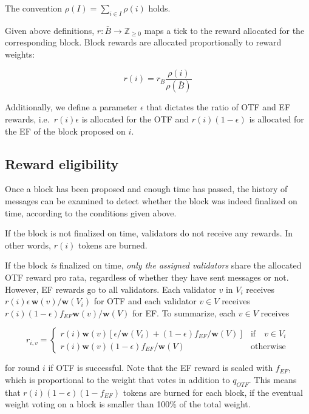 \documentclass[12pt]{article}
\begin{document}
The convention $\rho(I)=\sum_{i \in I} \rho(i)$ holds.

Given above definitions, $r:\bar{B}\to \mathbb{Z}_{\geq 0}$ maps a tick to the reward allocated for the corresponding block. Block rewards are allocated proportionally to reward weights:

\begin{equation}
  r(i) = r_B \frac{\rho(i)}{\rho(\bar{B})}
\end{equation}

Additionally, we define a parameter $\epsilon$ that dictates the ratio of OTF and EF rewards, i.e.~$r(i)\epsilon$ is allocated for the OTF and $r(i)(1-\epsilon)$ is allocated for the EF of the block proposed on $i$.

\subsection{Reward eligibility}
\label{reward-eligibility}

Once a block has been proposed and enough time has passed, the history of messages can be examined to detect whether the block was indeed finalized on time, according to the conditions given above.

If the block is not finalized on time, validators do not receive any rewards. In other words, $r(i)$ tokens are burned.

If the block \emph{is} finalized on time, \emph{only the assigned validators} share the allocated OTF reward pro rata, regardless of whether they have sent messages or not. However, EF rewards go to all validators. Each validator $v$ in $V_i$ receives $r(i)\epsilon \,\boldsymbol{w}(v)/\boldsymbol{w}(V_i)$ for OTF and each validator $v\in V$ receives $r(i)(1-\epsilon)f_{EF}\boldsymbol{w}(v)/\boldsymbol{w}(V)$ for EF. To summarize, each $v\in V$ receives

\begin{equation}
  r_{i,v} = \begin{cases} r(i)\boldsymbol{w}(v)[\epsilon/\boldsymbol{w}(V_i) + (1-\epsilon)f_{EF}/\boldsymbol{w}(V)] &\text{if}\quad v\in V_i\\
    r(i)\boldsymbol{w}(v)(1-\epsilon)f_{EF}/\boldsymbol{w}(V) & \text{otherwise}
  \end{cases}
\end{equation}

for round $i$ if OTF is successful. Note that the EF reward is scaled with $f_{EF}$, which is proportional to the weight that votes in addition to $q_{OTF}$. This means that $r(i)(1-\epsilon)(1-f_{EF})$ tokens are burned for each block, if the eventual weight voting on a block is smaller than 100\% of the total weight.
\end{document}
